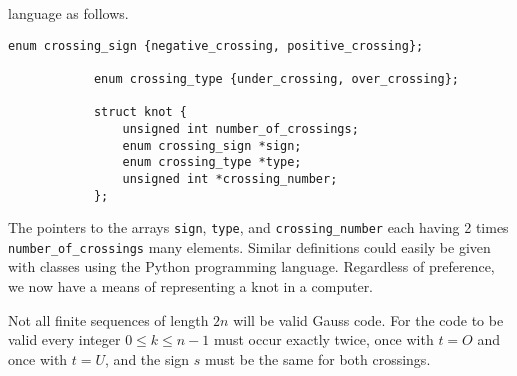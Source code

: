 \documentclass{article}
\theoremstyle{plain}
\begin{document}
        language as follows.
        \begin{lstlisting}[style=CStyle, gobble=12]
            enum crossing_sign {negative_crossing, positive_crossing};

            enum crossing_type {under_crossing, over_crossing};

            struct knot {
                unsigned int number_of_crossings;
                enum crossing_sign *sign;
                enum crossing_type *type;
                unsigned int *crossing_number;
            };
        \end{lstlisting}
        The pointers to the arrays \texttt{sign}, \texttt{type}, and
        \texttt{crossing\_number} each having 2 times
        \texttt{number\_of\_crossings} many elements.
        Similar definitions could easily be given with classes using the
        Python programming language. Regardless of preference, we now have a
        means of representing a knot in a computer.
        \par\hfill\par
        Not all finite sequences of length $2n$ will be valid Gauss code. For
        the code to be valid every integer $0\leq{k}\leq{n-1}$ must occur
        exactly twice, once with $t=O$ and once with $t=U$, and the sign
        $s$ must be the same for both crossings.
\end{document}
